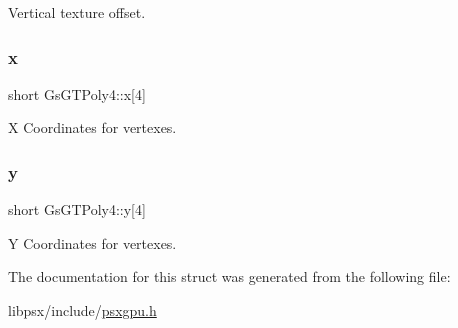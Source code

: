 Vertical texture offset. 

\mbox{\label{structGsGTPoly4_ae9d7d0c778bc80e6e689dad2ccae3fe3}} 
\subsubsection{\texorpdfstring{x}{x}}
{\footnotesize\ttfamily short Gs\+G\+T\+Poly4\+::x\mbox{[}4\mbox{]}}



X Coordinates for vertexes. 

\mbox{\label{structGsGTPoly4_a979238f05c29e735ea951c8758c106d3}} 
\subsubsection{\texorpdfstring{y}{y}}
{\footnotesize\ttfamily short Gs\+G\+T\+Poly4\+::y\mbox{[}4\mbox{]}}



Y Coordinates for vertexes. 



The documentation for this struct was generated from the following file\+:\begin{DoxyCompactItemize}
\item 
libpsx/include/\hyperlink{psxgpu_8h}{psxgpu.\+h}\end{DoxyCompactItemize}

